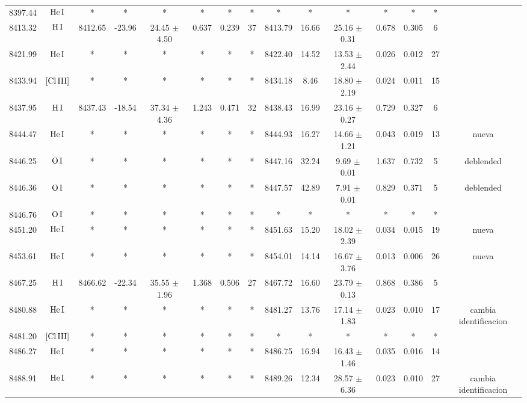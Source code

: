 \documentclass{article}
\begin{document}
\begin{table*}
\begin{adjustbox}{width=\textwidth}
\begin{tabular}{ccccccccccccccc}
8397.44 & $\mbox{He}\thinspace \mbox{I}$ & * & * & * & * & * & * & * & * & * & * & * & * &  \\
8413.32 & $\mbox{H}\thinspace \mbox{I}$ & 8412.65 & -23.96 & 24.45 $\pm$ 4.50 & 0.637 & 0.239 & 37 & 8413.79 & 16.66 & 25.16 $\pm$ 0.31 & 0.678 & 0.305 & 6 &  \\
8421.99 & $\mbox{He}\thinspace \mbox{I}$ & * & * & * & * & * & * & 8422.40 & 14.52 & 13.53 $\pm$ 2.44 & 0.026 & 0.012 & 27 &  \\
8433.94 & $\mbox{[Cl}\thinspace \mbox{III]}$ & * & * & * & * & * & * & 8434.18 & 8.46 & 18.80 $\pm$ 2.19 & 0.024 & 0.011 & 15 &  \\
8437.95 & $\mbox{H}\thinspace \mbox{I}$ & 8437.43 & -18.54 & 37.34 $\pm$ 4.36 & 1.243 & 0.471 & 32 & 8438.43 & 16.99 & 23.16 $\pm$ 0.27 & 0.729 & 0.327 & 6 &  \\
8444.47 & $\mbox{He}\thinspace \mbox{I}$ & * & * & * & * & * & * & 8444.93 & 16.27 & 14.66 $\pm$ 1.21 & 0.043 & 0.019 & 13 &  nueva \\
8446.25 & $\mbox{O}\thinspace \mbox{I}$ & * & * & * & * & * & * & 8447.16 & 32.24 & 9.69 $\pm$ 0.01 & 1.637 & 0.732 & 5 &  deblended \\
8446.36 & $\mbox{O}\thinspace \mbox{I}$ & * & * & * & * & * & * & 8447.57 & 42.89 & 7.91 $\pm$ 0.01 & 0.829 & 0.371 & 5 &  deblended \\
8446.76 & $\mbox{O}\thinspace \mbox{I}$ & * & * & * & * & * & * & * & * & * & * & * & * &  \\
8451.20 & $\mbox{He}\thinspace \mbox{I}$ & * & * & * & * & * & * & 8451.63 & 15.20 & 18.02 $\pm$ 2.39 & 0.034 & 0.015 & 19 &  nueva \\
8453.61 & $\mbox{He}\thinspace \mbox{I}$ & * & * & * & * & * & * & 8454.01 & 14.14 & 16.67 $\pm$ 3.76 & 0.013 & 0.006 & 26 &  nueva \\
8467.25 & $\mbox{H}\thinspace \mbox{I}$ & 8466.62 & -22.34 & 35.55 $\pm$ 1.96 & 1.368 & 0.506 & 27 & 8467.72 & 16.60 & 23.79 $\pm$ 0.13 & 0.868 & 0.386 & 5 &  \\
8480.88 & $\mbox{He}\thinspace \mbox{I}$ & * & * & * & * & * & * & 8481.27 & 13.76 & 17.14 $\pm$ 1.83 & 0.023 & 0.010 & 17 &  cambia identificacion \\
8481.20 & $\mbox{[Cl}\thinspace \mbox{III]}$ & * & * & * & * & * & * & * & * & * & * & * & * &  \\
8486.27 & $\mbox{He}\thinspace \mbox{I}$ & * & * & * & * & * & * & 8486.75 & 16.94 & 16.43 $\pm$ 1.46 & 0.035 & 0.016 & 14 &  \\
8488.91 & $\mbox{He}\thinspace \mbox{I}$ & * & * & * & * & * & * & 8489.26 & 12.34 & 28.57 $\pm$ 6.36 & 0.023 & 0.010 & 27 &  cambia identificacion \\

\end{tabular}
\end{adjustbox}
\end{table*}
\end{document}
